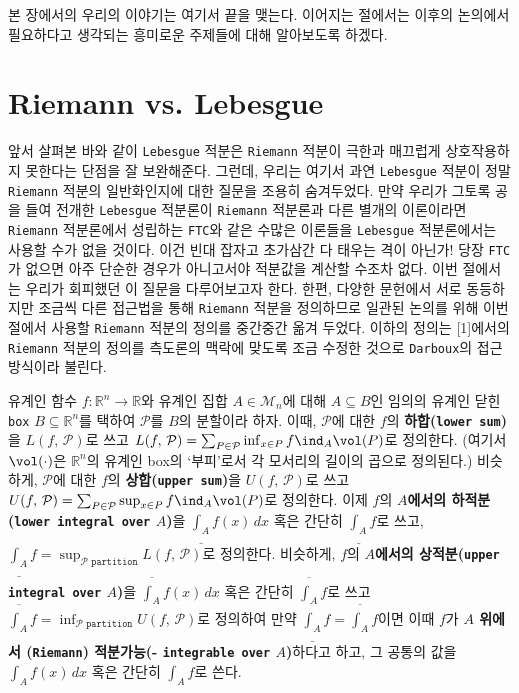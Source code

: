 본 장에서의 우리의 이야기는 여기서 끝을 맺는다. 이어지는 절에서는 이후의 논의에서 필요하다고 생각되는 흥미로운 주제들에 대해 알아보도록 하겠다.

\section{Riemann vs. Lebesgue}

앞서 살펴본 바와 같이 \texttt{Lebesgue} 적분은 \texttt{Riemann} 적분이 극한과 매끄럽게 상호작용하지 못한다는 단점을 잘 보완해준다. 그런데, 우리는 여기서 과연 \texttt{Lebesgue} 적분이 정말 \texttt{Riemann} 적분의 일반화인지에 대한 질문을 조용히 숨겨두었다. 만약 우리가 그토록 공을 들여 전개한 \texttt{Lebesgue} 적분론이 \texttt{Riemann} 적분론과 다른 별개의 이론이라면 \texttt{Riemann} 적분론에서 성립하는 \texttt{FTC}와 같은 수많은 이론들을 \texttt{Lebesgue} 적분론에서는 사용할 수가 없을 것이다. 이건 빈대 잡자고 초가삼간 다 태우는 격이 아닌가! 당장 \texttt{FTC}가 없으면 아주 단순한 경우가 아니고서야 적분값을 계산할 수조차 없다. 이번 절에서는 우리가 회피했던 이 질문을 다루어보고자 한다. 한편, 다양한 문헌에서 서로 동등하지만 조금씩 다른 접근법을 통해 \texttt{Riemann} 적분을 정의하므로 일관된 논의를 위해 이번 절에서 사용할 \texttt{Riemann} 적분의 정의를 중간중간 옮겨 두었다. 이하의 정의는 [1]에서의 \texttt{Riemann} 적분의 정의를 측도론의 맥락에 맞도록 조금 수정한 것으로 \texttt{Darboux}의 접근방식이라 불린다.

\begin{definition}
    유계인 함수 $f:\mathbb{R}^n\to\mathbb{R}$와 유계인 집합 $A\in\mathcal{M}_n$에 대해 $A\subseteq B$인 임의의 유계인 닫힌 \texttt{box} $B\subseteq\mathbb{R}^n$를 택하여 $\mathcal{P}$를 $B$의 분할이라 하자. 이때, $\mathcal{P}$에 대한 $f$의 \textbf{하합(\texttt{lower sum})}을 $L(f,\,\mathcal{P})$로 쓰고 $L(f,\,\mathcal{P})=\sum_{P\in\mathcal{P}}\inf_{x\in P}f\ind_A\vol(P)$로 정의한다. (여기서 $\vol(\cdot)$은 $\mathbb{R}^n$의 유계인 box의 `부피'로서 각 모서리의 길이의 곱으로 정의된다.) 비슷하게, $\mathcal{P}$에 대한 $f$의 \textbf{상합(\texttt{upper sum})}을 $U(f,\,\mathcal{P})$로 쓰고 $U(f,\,\mathcal{P})=\sum_{P\in\mathcal{P}}\sup_{x\in P}f\ind_A\vol(P)$로 정의한다. 이제 $f$의 \textbf{$A$에서의 하적분(\texttt{lower integral over} $A$)}을 $\underline{\int_A}f(x)\,dx$ 혹은 간단히 $\underline{\int_A}f$로 쓰고, $\underline{\int_A}f=\sup_{\mathcal{P}\texttt{ partition}}L(f,\,\mathcal{P})$로 정의한다. 비슷하게, $f$의 \textbf{$A$에서의 상적분(\texttt{upper integral over} $A$)}을 $\overline{\int_A}f(x)\,dx$ 혹은 간단히 $\overline{\int_A}f$로 쓰고 $\overline{\int_A}f=\inf_{\mathcal{P}\texttt{ partition}}U(f,\,\mathcal{P})$로 정의하여 만약 $\underline{\int_A}f=\overline{\int_A}f$이면 이때 $f$가 \textbf{$A$ 위에서 (\texttt{Riemann}) 적분가능(- \texttt{integrable over} $A$)}하다고 하고, 그 공통의 값을 $\int_Af(x)\,dx$ 혹은 간단히 $\int_Af$로 쓴다.
\end{definition}

